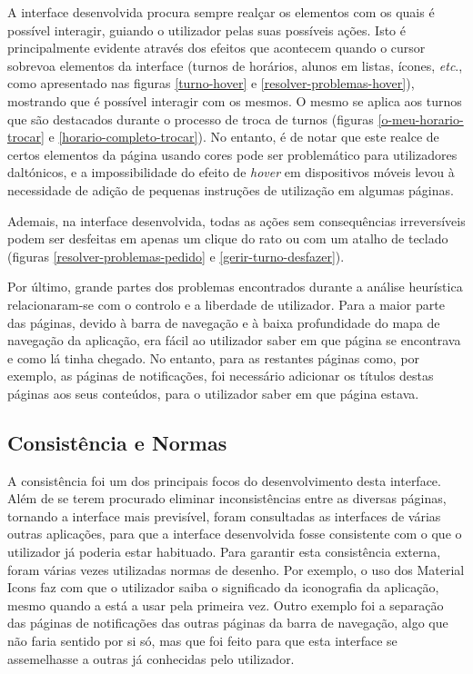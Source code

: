 \documentclass[12pt, a4paper]{article}
\begin{document}
A interface desenvolvida procura sempre realçar os elementos com os quais é possível interagir,
guiando o utilizador pelas suas possíveis ações. Isto é principalmente evidente através dos
efeitos que acontecem quando o cursor sobrevoa elementos da interface (turnos de horários,
alunos em listas, ícones, \emph{etc}., como apresentado nas figuras \ref{turno-hover} e
\ref{resolver-problemas-hover}), mostrando que é possível interagir com os mesmos. O mesmo se aplica
aos turnos que são destacados durante o processo de troca de turnos (figuras
\ref{o-meu-horario-trocar} e \ref{horario-completo-trocar}). No entanto, é de notar que este realce
de certos elementos da página usando cores pode ser problemático para utilizadores daltónicos, e a
impossibilidade do efeito de \emph{hover} em dispositivos móveis levou à necessidade de adição de
pequenas instruções de utilização em algumas páginas.

Ademais, na interface desenvolvida, todas as ações sem consequências irreversíveis podem ser
desfeitas em apenas um clique do rato ou com um atalho de teclado (figuras
\ref{resolver-problemas-pedido} e \ref{gerir-turno-desfazer}).

Por último, grande partes dos problemas encontrados durante a análise heurística relacionaram-se com
o controlo e a liberdade de utilizador. Para a maior parte das páginas, devido à barra de navegação
e à baixa profundidade do mapa de navegação da aplicação, era fácil ao utilizador saber em que
página se encontrava e como lá tinha chegado. No entanto, para as restantes páginas como, por
exemplo, as páginas de notificações, foi necessário adicionar os títulos destas páginas aos seus
conteúdos, para o utilizador saber em que página estava.

\subsection{Consistência e Normas}

A consistência foi um dos principais focos do desenvolvimento desta interface. Além de se terem
procurado eliminar inconsistências entre as diversas páginas, tornando a interface mais previsível,
foram consultadas as interfaces de várias outras aplicações, para que a interface desenvolvida
fosse consistente com o que o utilizador já poderia estar habituado. Para garantir esta consistência
externa, foram várias vezes utilizadas normas de desenho. Por exemplo, o uso dos Material Icons
\cite{material-icons} faz com que o utilizador saiba o significado da iconografia da aplicação,
mesmo quando a está a usar pela primeira vez. Outro exemplo foi a separação das páginas de
notificações das outras páginas da barra de navegação, algo que não faria sentido por si só, mas que
foi feito para que esta interface se assemelhasse a outras já conhecidas pelo utilizador.
\end{document}
